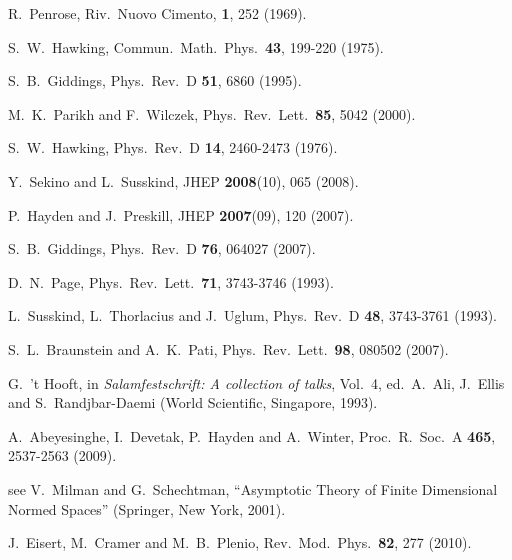 \documentclass[twocolumn,aps,prl]{revtex4}
\begin{document}
\begin{thebibliography}{16}

 R.\ Penrose,
Riv.\ Nuovo Cimento, {\bf 1}, 252 (1969).

 S.\ W.\ Hawking,
Commun.\ Math.\ Phys.\ {\bf 43}, 199-220 (1975).

 S.\ B.\ Giddings,
Phys.\ Rev.\ D {\bf 51}, 6860 (1995).

 M.\ K.\ Parikh and F.\ Wilczek,
Phys.\ Rev.\ Lett.\ {\bf 85}, 5042 (2000).

 S.\ W.\ Hawking,
Phys.\ Rev.\ D {\bf 14}, 2460-2473 (1976).

 Y.\ Sekino and L.\ Susskind,
JHEP {\bf 2008}(10), 065 (2008).

 P.\ Hayden and J.\ Preskill,
JHEP {\bf 2007}(09), 120 (2007).

 S.\ B.\ Giddings,
Phys.\ Rev.\ D {\bf 76}, 064027 (2007).

 D.\ N.\ Page,
Phys.\ Rev.\ Lett.\ {\bf 71}, 3743-3746 (1993).

 L.\ Susskind, L.\ Thorlacius and J.\ Uglum,
Phys.\ Rev.\ D {\bf 48}, 3743-3761 (1993).

 S.\ L.\ Braunstein and A.\ K.\ Pati,
Phys.\ Rev.\ Lett.\ {\bf 98}, 080502 (2007).

 G.\ 't Hooft,
in {\it Salamfestschrift: A collection of talks}, 
Vol.\ 4, ed.\ A.\ Ali, J.\ Ellis and S.\ Randjbar-Daemi
(World Scientific, Singapore, 1993).

 A.\ Abeyesinghe, I.\ Devetak, P.\ Hayden and A.\ Winter,
Proc.\ R.\ Soc.\ A {\bf 465}, 2537-2563 (2009). 

 see
V.\ Milman and G.\ Schechtman,
``Asymptotic Theory of Finite Dimensional Normed Spaces''
(Springer, New York, 2001).

 J.\ Eisert, M.\ Cramer and M.\ B.\ Plenio,
Rev.\ Mod.\ Phys.\ {\bf 82}, 277 (2010).


\end{thebibliography}
\end{document}

